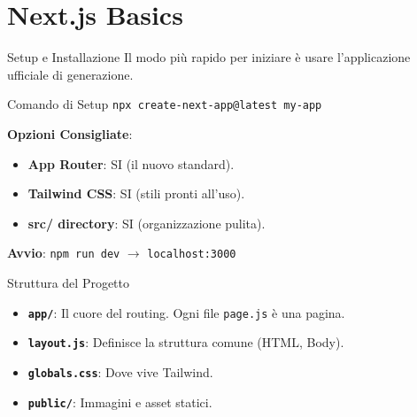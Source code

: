 \documentclass[10pt]{beamer}
\begin{document}
\section{Next.js Basics}
\begin{frame}[fragile]{Setup e Installazione}
    Il modo più rapido per iniziare è usare l'applicazione ufficiale di generazione.
    \begin{block}{Comando di Setup}
        \texttt{npx create-next-app@latest my-app}
    \end{block}
    \textbf{Opzioni Consigliate}:
    \begin{itemize}
        \item \textbf{App Router}: SI (il nuovo standard).
        \item \textbf{Tailwind CSS}: SI (stili pronti all'uso).
        \item \textbf{src/ directory}: SI (organizzazione pulita).
    \end{itemize}
    \vspace{0.3cm}
    \textbf{Avvio}: \texttt{npm run dev} $\rightarrow$ \texttt{localhost:3000}
\end{frame}

\begin{frame}{Struttura del Progetto}
    \begin{itemize}
        \item \textbf{\texttt{app/}}: Il cuore del routing. Ogni file \texttt{page.js} è una pagina.
        \item \textbf{\texttt{layout.js}}: Definisce la struttura comune (HTML, Body).
        \item \textbf{\texttt{globals.css}}: Dove vive Tailwind.
        \item \textbf{\texttt{public/}}: Immagini e asset statici.
    \end{itemize}
    \centering
\end{frame}
\end{document}

